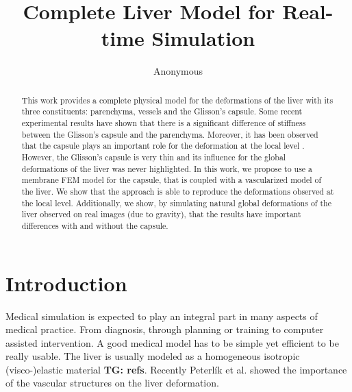 \documentclass{llncs}
\newcommand{\TG}[1]{{\color{blue}\textbf{TG: #1}}}
\begin{document}
%
%
\mainmatter              %
%
\title{Complete Liver Model for Real-time Simulation} %
%
%
\author{Anonymous}
%
%
%
\maketitle

\begin{abstract}
This work provides a complete physical model for the deformations of the liver with its three constituents: parenchyma, vessels and the Glisson's capsule.
Some recent experimental results \cite{Ahn2010} have shown that there is a significant difference of stiffness between the Glisson's capsule and the parenchyma. 
Moreover, it has been observed that the capsule plays an important role for the deformation at the local level \cite{Hollenstein2006}.
However, the Glisson's capsule is very thin and its influence for the global deformations of the liver was never highlighted.
In this work, we propose to use a membrane FEM model for the capsule, that is coupled with a vascularized model of the liver.
We show that the approach is able to reproduce the deformations observed at the local level.
Additionally, we show, by simulating natural global deformations of the liver observed on real images (due to gravity), that the results have important differences with and without the capsule.

\end{abstract}

\section{Introduction} %

Medical simulation is expected to play an integral part in many aspects of
medical practice. From diagnosis, through planning or training to computer
assisted intervention. A good medical model has to be simple yet efficient
to be really usable.
The liver is usually modeled as a homogeneous isotropic (visco-)elastic
material \TG{refs}.%
Recently
Peterl\'{i}k et al. \cite{Peterlik2012} showed the importance of the vascular
structures on the liver deformation.
\end{document}
